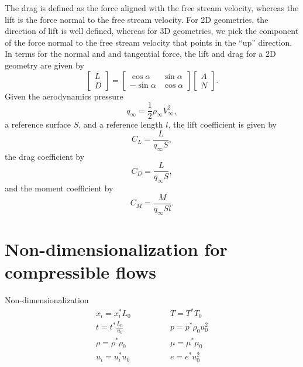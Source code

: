 \documentclass[oneside,a4paper,11pt]{report}
\begin{document}
The drag is defined as the force aligned with the free stream velocity, whereas the lift is the force normal to the free stream velocity. For 2D geometries, the direction of lift is well defined, whereas for 3D geometries, we pick the component of the force normal to the free stream velocity that points in the ``up'' direction. In terms for the normal and and tangential force, the lift and drag for a 2D geometry are given by
\begin{equation}
    \begin{bmatrix} L \\ D \end{bmatrix} = 
    \begin{bmatrix} \cos \alpha & \sin \alpha \\ -\sin \alpha & \cos \alpha \end{bmatrix} \begin{bmatrix} A \\ N \end{bmatrix}.
\end{equation}
Given the aerodynamics pressure
\begin{equation}
    q_\infty = \frac{1}{2} \rho_\infty V^2_\infty,
\end{equation}
a reference surface $S$, and a reference length $l$, the lift coefficient is given by
\begin{equation}
    C_L = \frac{L}{q_\infty S},
\end{equation}
the drag coefficient by
\begin{equation}
    C_D = \frac{L}{q_\infty S},
\end{equation}
and the moment coefficient by
\begin{equation}
    C_M = \frac{M}{q_\infty Sl}.
\end{equation}

%
\chapter{Non-dimensionalization for compressible flows}
%
Non-dimensionalization
\begin{align}
x_i = x^*_i L_0 &\qquad \qquad T = T^* T_0 \nonumber \\
t = t^* \frac{L_0}{u_0} &\qquad \qquad p = p^* \rho_0 u^2_0 \nonumber \\
\rho = \rho^* \rho_0 &\qquad \qquad \mu = \mu^* \mu_0 \nonumber \\
u_i = u^*_i u_0 &\qquad \qquad e = e^* u_0^2
\end{align}
\end{document}
